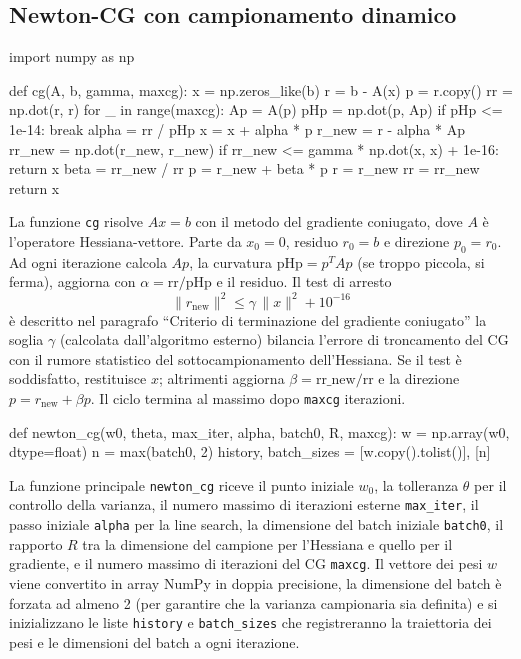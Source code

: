 \documentclass[a4paper,12pt]{article}
\numberwithin{equation}{section}
\numberwithin{figure}{section}
\numberwithin{table}{section}
\begin{document}
\subsection{Newton-CG con campionamento dinamico}
\begin{pythoncode}[title= Newton-CG]

import numpy as np

def cg(A, b, gamma, maxcg):
    x = np.zeros_like(b)
    r = b - A(x)
    p = r.copy()
    rr = np.dot(r, r)
    for _ in range(maxcg):
        Ap = A(p)
        pHp = np.dot(p, Ap)
        if pHp <= 1e-14:
            break
        alpha = rr / pHp
        x = x + alpha * p
        r_new = r - alpha * Ap
        rr_new = np.dot(r_new, r_new)
        if rr_new <= gamma * np.dot(x, x) + 1e-16:
            return x
        beta = rr_new / rr
        p = r_new + beta * p
        r = r_new
        rr = rr_new
    return x
\end{pythoncode}
La funzione \texttt{cg} risolve \(A x = b\) con il metodo del gradiente coniugato, dove \(A\) è l'operatore Hessiana-vettore. Parte da \(x_0=0\), residuo \(r_0=b\) e direzione \(p_0=r_0\). Ad ogni iterazione calcola \(Ap\), la curvatura \(\text{pHp}=p^T A p\) (se troppo piccola, si ferma), aggiorna con \(\alpha=\text{rr}/\text{pHp}\) e il residuo. Il test di arresto
\[
\|r_{\text{new}}\|^2 \le \gamma\,\|x\|^2 + 10^{-16}
\]
è descritto nel paragrafo ``Criterio di terminazione del gradiente coniugato'' la soglia \(\gamma\) (calcolata dall'algoritmo esterno) bilancia l'errore di troncamento del CG con il rumore statistico del sottocampionamento dell'Hessiana. Se il test è soddisfatto, restituisce \(x\); altrimenti aggiorna \(\beta = \text{rr\_new}/\text{rr}\) e la direzione \(p = r_{\text{new}} + \beta p\). Il ciclo termina al massimo dopo \texttt{maxcg} iterazioni.
\begin{pythoncode}[title= Newton-CG]

def newton_cg(w0, theta, max_iter, alpha, batch0, R, maxcg):
    w = np.array(w0, dtype=float)
    n = max(batch0, 2)
    history, batch_sizes = [w.copy().tolist()], [n]
\end{pythoncode}
La funzione principale \texttt{newton\_cg} riceve il punto iniziale \(w_0\), la tolleranza \(\theta\) per il controllo della varianza, il numero massimo di iterazioni esterne \texttt{max\_iter}, il passo iniziale \texttt{alpha} per la line search, la dimensione del batch iniziale \texttt{batch0}, il rapporto \(R\) tra la dimensione del campione per l'Hessiana e quello per il gradiente, e il numero massimo di iterazioni del CG \texttt{maxcg}. Il vettore dei pesi \(w\) viene convertito in array NumPy in doppia precisione, la dimensione del batch è forzata ad almeno 2 (per garantire che la varianza campionaria sia definita) e si inizializzano le liste \texttt{history} e \texttt{batch\_sizes} che registreranno la traiettoria dei pesi e le dimensioni del batch a ogni iterazione.
\end{document}
